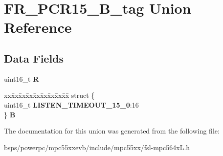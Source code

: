 \hypertarget{unionFR__PCR15__16B__tag}{}\section{F\+R\+\_\+\+P\+C\+R15\+\_\+B\+\_\+tag Union Reference}
\label{unionFR__PCR15__16B__tag}
\subsection*{Data Fields}
\begin{DoxyCompactItemize}
\item 
\mbox{\label{unionFR__PCR15__16B__tag_afad64b55d5feea440e71f1724fdebf19}} 
uint16\+\_\+t {\bfseries R}
\item 
\mbox{\label{unionFR__PCR15__16B__tag_a55e170410f0c367ad673dfa84ff0a0b0}} 
\begin{tabbing}
xx\=xx\=xx\=xx\=xx\=xx\=xx\=xx\=xx\=\kill
struct \{\\
\>uint16\_t {\bfseries LISTEN\_TIMEOUT\_15\_0}:16\\
\} {\bfseries B}\\

\end{tabbing}\end{DoxyCompactItemize}


The documentation for this union was generated from the following file\+:\begin{DoxyCompactItemize}
\item 
bsps/powerpc/mpc55xxevb/include/mpc55xx/fsl-\/mpc564x\+L.\+h\end{DoxyCompactItemize}
